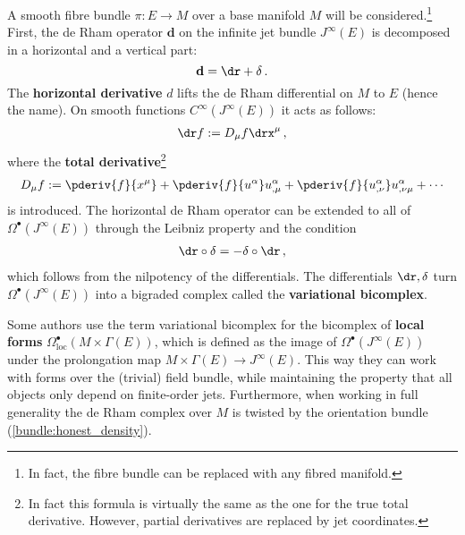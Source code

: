     A smooth fibre bundle $\pi:E\rightarrow M$ over a base manifold $M$ will be considered.\footnote{In fact, the fibre bundle can be replaced with any fibred manifold.} First, the de Rham operator $\mathbf{d}$ on the infinite jet bundle $J^\infty(E)$ is decomposed in a horizontal and a vertical part: \[\mathbf{d} = \dr+\delta\,.\] The \textbf{horizontal derivative} $d$ lifts the de Rham differential on $M$ to $E$ (hence the name). On smooth functions $C^\infty(J^\infty(E))$ it acts as follows:
    \begin{gather}
        \dr f := D_\mu f\drx^\mu\,,
    \end{gather}
    where the \textbf{total derivative}\footnote{In fact this formula is virtually the same as the one for the true total derivative. However, partial derivatives are replaced by jet coordinates.}
    \begin{gather}
        D_\mu f := \pderiv{f}{x^\mu} + \pderiv{f}{u^\alpha}u^\alpha_{,\mu} + \pderiv{f}{u^\alpha_{,\nu}}u^\alpha_{,\nu\mu} + \cdots
    \end{gather}
    is introduced. The horizontal de Rham operator can be extended to all of $\Omega^\bullet(J^\infty(E))$ through the Leibniz property and the condition
    \begin{gather}
        \dr\circ\delta = -\delta\circ\dr\,,
    \end{gather}
    which follows from the nilpotency of the differentials. The differentials $\dr,\delta$ turn $\Omega^\bullet(J^\infty(E))$ into a bigraded complex called the \textbf{variational bicomplex}.
    \begin{remark}
        Some authors use the term variational bicomplex for the bicomplex of \textbf{local forms} $\Omega^\bullet_\mathrm{loc}(M\times\Gamma(E))$, which is defined as the image of $\Omega^\bullet(J^\infty(E))$ under the prolongation map $M\times\Gamma(E)\rightarrow J^\infty(E)$. This way they can work with forms over the (trivial) field bundle, while maintaining the property that all objects only depend on finite-order jets. Furthermore, when working in full generality the de Rham complex over $M$ is twisted by the orientation bundle (\cref{bundle:honest_density}).
    \end{remark}

